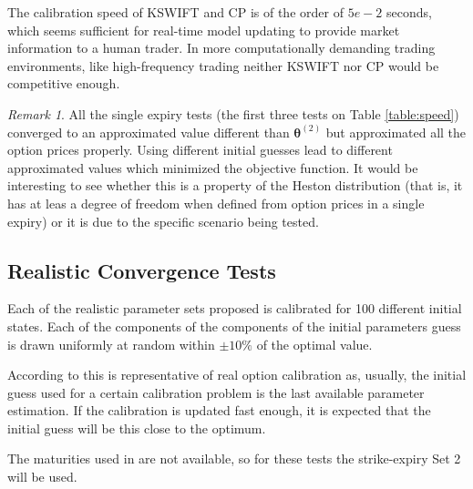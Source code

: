 \documentclass[12,twoside]{mammeTFM}
\theoremstyle{definition}
\theoremstyle{remark}
\newtheorem{remark}[thm]{Remark}
\begin{document}
The calibration speed of KSWIFT and CP is of the order of $5e-2$ seconds, which seems sufficient for real-time model updating to provide market information to a human trader. In more computationally demanding trading environments, like high-frequency trading neither KSWIFT nor CP would be competitive enough.

\begin{remark}
All the single expiry tests (the first three tests on Table \ref{table:speed}) converged to an approximated value different than $\boldsymbol{\theta}^{(2)}$ but approximated all the option prices properly. Using different initial guesses lead to different approximated values which minimized the objective function. It would be interesting to see whether this is a property of the Heston distribution (that is, it has at leas a degree of freedom when defined from option prices in a single expiry) or it is due to the specific scenario being tested.
\end{remark}

\subsection{Realistic Convergence Tests}

Each of the realistic parameter sets proposed is calibrated for 100 different initial states. Each of the components of the components of the initial parameters guess is drawn uniformly at random within $\pm 10\%$ of the optimal value. 

According to \cite{cui17} this is representative of real option calibration as, usually, the initial guess used for a certain calibration problem is the last available parameter estimation. If the calibration is updated fast enough, it is expected that the initial guess will be this close to the optimum.

The maturities used in \cite{cui17} are not available, so for these tests the strike-expiry Set 2 will be used.
\end{document}
